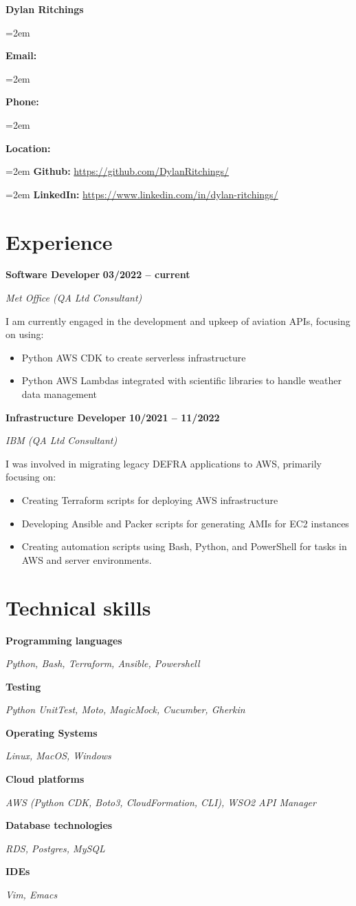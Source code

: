 \documentclass[12pt]{article}
\newlength{\spacebox}
\newcommand{\sepspace}{\vspace*{1em}}
\newcommand{\name}[1]{
\Huge 
\begin{center} \textbf{#1} \end{center}\par
\normalsize}
\newcommand{\info}[2]{
  \noindent\hangindent=2em\hangafter=0
  \parbox{\spacebox}{%
    \textbf{#1:}} #2 \par
  } %
\newcommand{\link}[2]{
  \noindent\hangindent=2em\hangafter=0
  \textbf{#1:} \url{#2} \par
  }
\newcommand{\skill}[2]{
\noindent\hangafter=0
\begin{minipage}[t]{0.31\textwidth}
  \textbf{#1} 
  \end{minipage}
  \hfill %
  \begin{minipage}[t]{0.6\textwidth}
      #2
  \end{minipage}
  \par
  \vspace*{0.5em}} %
\newcommand{\work}[4]{
  \noindent  \textbf{#1}
  \hfill 
  {%
  \centering\textbf{#2}} \par
  \noindent \textit{#3} \par
  \vspace*{0.3em}
  \noindent\hangafter=0 \small #4 
\normalsize \par}
\begin{document}
\name{Dylan Ritchings}
\vspace*{-10pt}

\sepspace
\info{Email}{}
\info{Phone}{}
\info{Location}{}

\sepspace
\link{Github}{https://github.com/DylanRitchings/}
\link{LinkedIn}{https://www.linkedin.com/in/dylan-ritchings/}

\section*{Experience}

\work{Software Developer}{03/2022 -- current}{Met Office (QA Ltd Consultant)}
{I am currently engaged in the development and upkeep of aviation APIs, focusing on using:

\begin{itemize}
    \item Python AWS CDK to create serverless infrastructure
    \item Python AWS Lambdas integrated with scientific libraries to handle weather data management
\end{itemize}}

\sepspace

\work{Infrastructure Developer}{10/2021 -- 11/2022}{IBM (QA Ltd Consultant)}
{I was involved in migrating legacy DEFRA applications to AWS, primarily focusing on:
\begin{itemize}
    \item Creating Terraform scripts for deploying AWS infrastructure
    \item Developing Ansible and Packer scripts for generating AMIs for EC2 instances
    \item Creating automation scripts using Bash, Python, and PowerShell for tasks in AWS and server environments.
\end{itemize}}

\section*{Technical skills}

\skill{Programming languages}{\textsl{Python, Bash, Terraform, Ansible, Powershell}}
\skill{Testing}{\textsl {Python UnitTest, Moto, MagicMock, Cucumber, Gherkin}}
\skill{Operating Systems}{\textsl{Linux, MacOS, Windows}}
\skill{Cloud platforms}{\textsl{AWS (Python CDK, Boto3, CloudFormation, CLI), WSO2 API Manager}}
\skill{Database technologies}{\textsl{RDS, Postgres, MySQL}}
\skill{IDEs}{\textsl{Vim, Emacs}}
\end{document}
